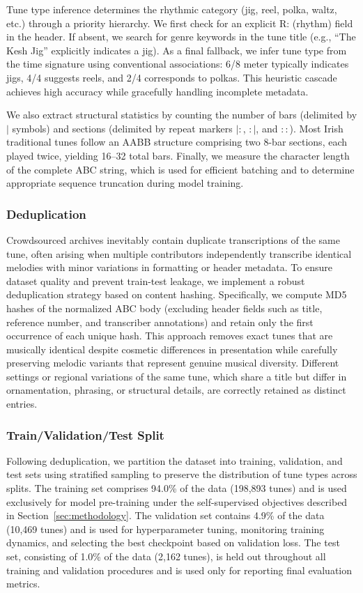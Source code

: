 \documentclass[]{interact}
\theoremstyle{plain}
\theoremstyle{definition}
\theoremstyle{remark}
\begin{document}
Tune type inference determines the rhythmic category (jig, reel, polka, waltz, etc.) through a priority hierarchy. We first check for an explicit R: (rhythm) field in the header. If absent, we search for genre keywords in the tune title (e.g., ``The Kesh Jig'' explicitly indicates a jig). As a final fallback, we infer tune type from the time signature using conventional associations: 6/8 meter typically indicates jigs, 4/4 suggests reels, and 2/4 corresponds to polkas. This heuristic cascade achieves high accuracy while gracefully handling incomplete metadata.

We also extract structural statistics by counting the number of bars (delimited by $|$ symbols) and sections (delimited by repeat markers $|:$, $:|$, and $::$). Most Irish traditional tunes follow an AABB structure comprising two 8-bar sections, each played twice, yielding 16--32 total bars. Finally, we measure the character length of the complete ABC string, which is used for efficient batching and to determine appropriate sequence truncation during model training.

\subsubsection{Deduplication}

Crowdsourced archives inevitably contain duplicate transcriptions of the same tune, often arising when multiple contributors independently transcribe identical melodies with minor variations in formatting or header metadata. To ensure dataset quality and prevent train-test leakage, we implement a robust deduplication strategy based on content hashing. Specifically, we compute MD5 hashes of the normalized ABC body (excluding header fields such as title, reference number, and transcriber annotations) and retain only the first occurrence of each unique hash. This approach removes exact tunes that are musically identical despite cosmetic differences in presentation while carefully preserving melodic variants that represent genuine musical diversity. Different settings or regional variations of the same tune, which share a title but differ in ornamentation, phrasing, or structural details, are correctly retained as distinct entries.

\subsubsection{Train/Validation/Test Split}

Following deduplication, we partition the dataset into training, validation, and test sets using stratified sampling to preserve the distribution of tune types across splits. The training set comprises 94.0\% of the data (198,893 tunes) and is used exclusively for model pre-training under the self-supervised objectives described in Section~\ref{sec:methodology}. The validation set contains 4.9\% of the data (10,469 tunes) and is used for hyperparameter tuning, monitoring training dynamics, and selecting the best checkpoint based on validation loss. The test set, consisting of 1.0\% of the data (2,162 tunes), is held out throughout all training and validation procedures and is used only for reporting final evaluation metrics.
\end{document}
